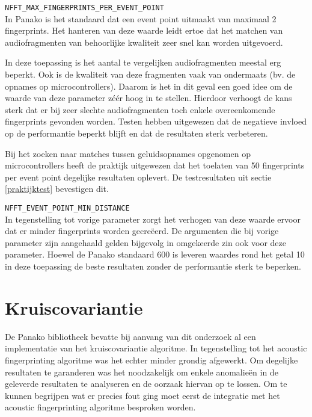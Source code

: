\begin{description}
	\item\texttt{NFFT\_MAX\_FINGERPRINTS\_PER\_EVENT\_POINT} \hfill \\
	In Panako is het standaard dat een event point uitmaakt van maximaal 2 fingerprints. Het hanteren van deze waarde leidt ertoe dat het matchen van audiofragmenten van behoorlijke kwaliteit zeer snel kan worden uitgevoerd. 
	
	In deze toepassing is het aantal te vergelijken audiofragmenten meestal erg beperkt. Ook is de kwaliteit van deze fragmenten vaak van ondermaats (bv. de opnames op microcontrollers). Daarom is het in dit geval een goed idee om de waarde van deze parameter zéér hoog in te stellen. Hierdoor verhoogt de kans sterk dat er bij zeer slechte audiofragmenten toch enkele overeenkomende fingerprints gevonden worden. Testen hebben uitgewezen dat de negatieve invloed op de performantie beperkt blijft en dat de resultaten sterk verbeteren. 
	
	Bij het zoeken naar matches tussen geluidsopnames opgenomen op microcontrollers heeft de praktijk uitgewezen dat het toelaten van 50 fingerprints per event point degelijke resultaten oplevert. De testresultaten uit sectie \ref{praktijktest} bevestigen dit.
	
	\item\texttt{NFFT\_EVENT\_POINT\_MIN\_DISTANCE} \hfill \\
	In tegenstelling tot vorige parameter zorgt het verhogen van deze waarde ervoor dat er minder fingerprints worden gecreëerd. De argumenten die bij vorige parameter zijn aangehaald gelden bijgevolg in omgekeerde zin ook voor deze parameter. Hoewel de Panako standaard 600 is leveren waardes rond het getal 10 in deze toepassing de beste resultaten zonder de performantie sterk te beperken.
	
	
\end{description}


\section{Kruiscovariantie}

De Panako bibliotheek bevatte bij aanvang van dit onderzoek al een implementatie van het kruiscovariantie algoritme. In tegenstelling tot het acoustic fingerprinting algoritme was het echter minder grondig afgewerkt. Om degelijke resultaten te garanderen was het noodzakelijk om enkele anomalieën in de geleverde resultaten te analyseren en de oorzaak hiervan op te lossen. Om te kunnen begrijpen wat er precies fout ging moet eerst de integratie met het acoustic fingerprinting algoritme besproken worden.

